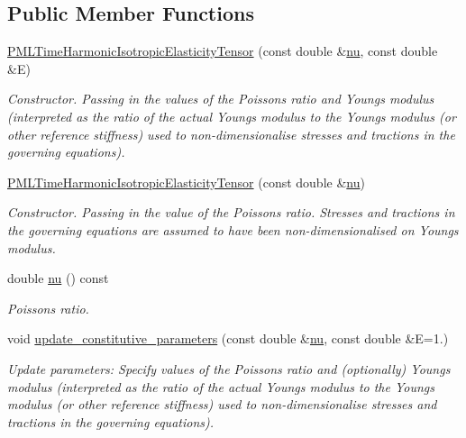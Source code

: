 \subsection*{Public Member Functions}
\begin{DoxyCompactItemize}
\item 
\hyperlink{classoomph_1_1PMLTimeHarmonicIsotropicElasticityTensor_a31b82a650e6e7f7485d0bf94eac00883}{P\+M\+L\+Time\+Harmonic\+Isotropic\+Elasticity\+Tensor} (const double \&\hyperlink{classoomph_1_1PMLTimeHarmonicIsotropicElasticityTensor_a6cc0a05cf8555f8a233894f65c38b555}{nu}, const double \&E)
\begin{DoxyCompactList}\small\item\em Constructor. Passing in the values of the Poisson\textquotesingle{}s ratio and Young\textquotesingle{}s modulus (interpreted as the ratio of the actual Young\textquotesingle{}s modulus to the Young\textquotesingle{}s modulus (or other reference stiffness) used to non-\/dimensionalise stresses and tractions in the governing equations). \end{DoxyCompactList}\item 
\hyperlink{classoomph_1_1PMLTimeHarmonicIsotropicElasticityTensor_a60b7dc4f2a2b71f5fdb4af8026134fbd}{P\+M\+L\+Time\+Harmonic\+Isotropic\+Elasticity\+Tensor} (const double \&\hyperlink{classoomph_1_1PMLTimeHarmonicIsotropicElasticityTensor_a6cc0a05cf8555f8a233894f65c38b555}{nu})
\begin{DoxyCompactList}\small\item\em Constructor. Passing in the value of the Poisson\textquotesingle{}s ratio. Stresses and tractions in the governing equations are assumed to have been non-\/dimensionalised on Young\textquotesingle{}s modulus. \end{DoxyCompactList}\item 
double \hyperlink{classoomph_1_1PMLTimeHarmonicIsotropicElasticityTensor_a6cc0a05cf8555f8a233894f65c38b555}{nu} () const
\begin{DoxyCompactList}\small\item\em Poisson\textquotesingle{}s ratio. \end{DoxyCompactList}\item 
void \hyperlink{classoomph_1_1PMLTimeHarmonicIsotropicElasticityTensor_a87798565f87daddd8b370ef4cb94f734}{update\+\_\+constitutive\+\_\+parameters} (const double \&\hyperlink{classoomph_1_1PMLTimeHarmonicIsotropicElasticityTensor_a6cc0a05cf8555f8a233894f65c38b555}{nu}, const double \&E=1.)
\begin{DoxyCompactList}\small\item\em Update parameters\+: Specify values of the Poisson\textquotesingle{}s ratio and (optionally) Young\textquotesingle{}s modulus (interpreted as the ratio of the actual Young\textquotesingle{}s modulus to the Young\textquotesingle{}s modulus (or other reference stiffness) used to non-\/dimensionalise stresses and tractions in the governing equations). \end{DoxyCompactList}\item 

\end{DoxyCompactItemize}
